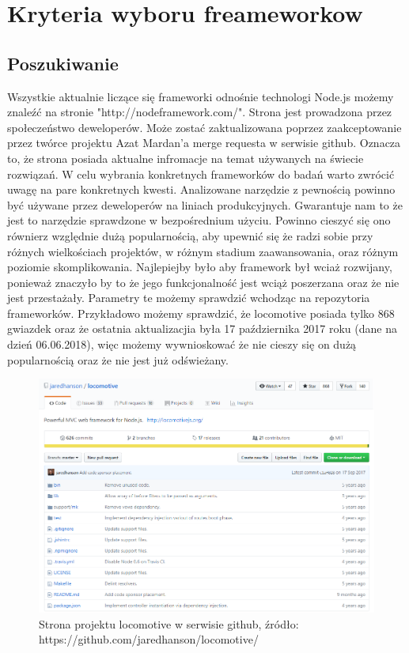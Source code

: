 \documentclass[12pt]{report}
\begin{document}
\chapter{Kryteria wyboru freameworkow}

  \section{Poszukiwanie}
  Wszystkie aktualnie liczące się frameworki odnośnie technologi Node.js możemy znaleźć na stronie "http://nodeframework.com/".
  Strona jest prowadzona przez społeczeństwo deweloperów.
  Może zostać zaktualizowana poprzez zaakceptowanie przez twórce projektu Azat Mardan'a merge requesta w serwisie github. 
  Oznacza to, że strona posiada aktualne infromacje na temat używanych na świecie rozwiązań.
  W celu wybrania konkretnych frameworków do badań warto zwrócić uwagę na pare konkretnych kwesti.
  Analizowane narzędzie z pewnością powinno być używane przez deweloperów na liniach produkcyjnych.
  Gwarantuje nam to że jest to narzędzie sprawdzone w bezpośrednium użyciu.
  Powinno cieszyć się ono równierz względnie dużą popularnością, aby upewnić się że radzi sobie przy różnych wielkościach projektów, w różnym stadium zaawansowania, oraz różnym poziomie skomplikowania.
  Najlepiejby było aby framework był wciaż rozwijany, ponieważ znaczyło by to że jego funkcjonalność jest wciąż poszerzana oraz że nie jest przestażały.
  Parametry te możemy sprawdzić wchodząc na repozytoria frameworków.
  Przykładowo możemy sprawdzić, że locomotive posiada tylko 868 gwiazdek oraz że ostatnia aktualizacjia była 17 października 2017 roku (dane na dzień 06.06.2018), więc możemy wywnioskować że nie cieszy się on dużą popularnością oraz że nie jest już odświeżany.

  \begin{figure}[!hb]
    \centering
    \includegraphics[width=\textwidth,height=\textheight,keepaspectratio]{locomotive.png} 
    \caption{Strona projektu locomotive w serwisie github, źródło: https://github.com/jaredhanson/locomotive/}
  \end{figure}
\end{document}
